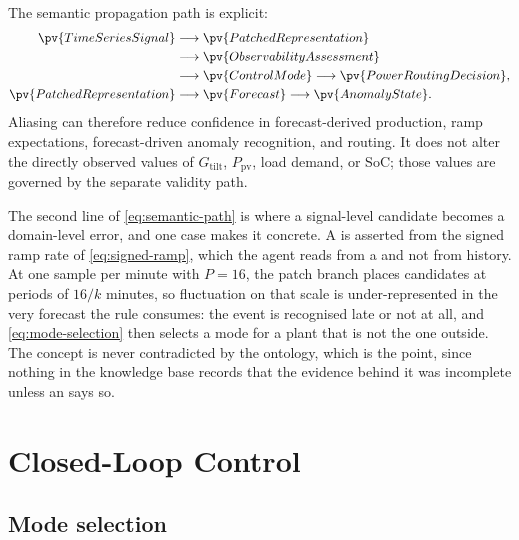 The semantic propagation path is explicit:
\begin{equation}
\begin{aligned}
\pv{TimeSeriesSignal}
&\longrightarrow \pv{PatchedRepresentation}\\
&\longrightarrow \pv{ObservabilityAssessment}\\
&\longrightarrow \pv{ControlMode}
\longrightarrow \pv{PowerRoutingDecision},\\
\pv{PatchedRepresentation}
&\longrightarrow \pv{Forecast}
\longrightarrow \pv{AnomalyState}.
\end{aligned}
\label{eq:semantic-path}
\end{equation}
Aliasing can therefore reduce confidence in forecast-derived production, ramp expectations, forecast-driven anomaly recognition, and routing. It does not alter the directly observed values of $G_{\mathrm{tilt}}$, $P_{\mathrm{pv}}$, load demand, or SoC; those values are governed by the separate validity path.

The second line of \autoref{eq:semantic-path} is where a signal-level candidate becomes a domain-level error, and one case makes it concrete. A  is asserted from the signed ramp rate of \autoref{eq:signed-ramp}, which the agent reads from a  and not from history. At one sample per minute with $P=16$, the patch branch places candidates at periods of $16/k$ minutes, so fluctuation on that scale is under-represented in the very forecast the rule consumes: the event is recognised late or not at all, and \autoref{eq:mode-selection} then selects a mode for a plant that is not the one outside. The concept is never contradicted by the ontology, which is the point, since nothing in the knowledge base records that the evidence behind it was incomplete unless an  says so.

\section{Closed-Loop Control}

\subsection{Mode selection}

